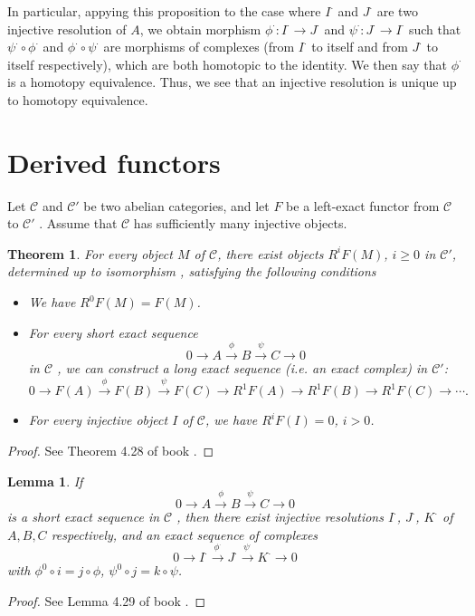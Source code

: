 \documentclass{article}
\numberwithin{equation}{subsection} %
\newtheorem{thm}{Theorem}[section]
\newtheorem{lemma}{Lemma}[section]
\theoremstyle{definition}
\begin{document}
In particular, appying this proposition to the case where $I^\cdot$ and
$J^\cdot$ are two injective resolution of $A$, we obtain morphism
$\phi^\cdot: I^\cdot \to J^\cdot$ and $\psi^\cdot: J^\cdot \to I^\cdot$ 
such that $\psi^\cdot\circ \phi^\cdot$ and $\phi^\cdot\circ \psi^\cdot$
are morphisms of complexes (from $I^\cdot$ to itself and from $J^\cdot$
to itself respectively), which are both homotopic to the identity.
We then say that $\phi^\cdot$ is a homotopy equivalence. Thus, we see that
an injective resolution is unique up to homotopy equivalence.

\section{Derived functors}
Let $\mathcal{C}$  and $\mathcal{C'}$  be two abelian categories, and let
$F$ be a left-exact functor from $\mathcal{C}$ 
to $\mathcal{C'}$ . Assume that $\mathcal{C}$  has sufficiently many injective objects.

\begin{thm}
	For every object $M$ of $\mathcal{C}$, there exist objects 
	$R^i F(M)$, $i\geq 0$ in $\mathcal{C'}$, determined up to isomorphism
	, satisfying the following conditions
	\begin{itemize}
		\item We have $R^0 F(M) = F(M)$.
		\item For every short exact sequence
			$$ 0\to A\overset{\phi}{\to} B\overset{\psi}{\to}
			C \to 0$$
		in $\mathcal{C}$ , we can construct a long exact sequence
		(i.e. an exact complex) in $\mathcal{C'}$:
		$$ 0\to F(A) \overset{\phi}{\to} F(B) \overset{\psi}{\to}
		F(C) \to R^1 F(A) \to R^1 F(B) \to R^1F(C) \to \cdots.$$
		\item
		For every injective object $I$ of $\mathcal{C}$, we
		have $R^iF(I)=0$, $i>0$.
	\end{itemize}
\end{thm}
\begin{proof}
	See Theorem 4.28 of book \cite{voisin}.
\end{proof}

\begin{lemma}
    If
    $$ 0\to A \overset{\phi}{\to} B \overset{\psi}{\to} C\to 0 $$
    is a short exact sequence in $\mathcal{C}$ , then there exist injective
    resolutions $I^\cdot$, $J^\cdot$, $K^\cdot$ of $A,B,C$ respectively,
    and an exact sequence of complexes
    $$ 0\to I^\cdot \overset{\phi^\cdot}{\to} J^\cdot \overset{\psi^\cdot}{\to} 
    K^\cdot\to 0$$
    with $\phi^0 \circ i = j\circ \phi$, $\psi^0\circ j=k\circ\psi$.
\end{lemma}
\begin{proof}
	See Lemma 4.29 of book \cite{voisin}.
\end{proof}
\end{document}
